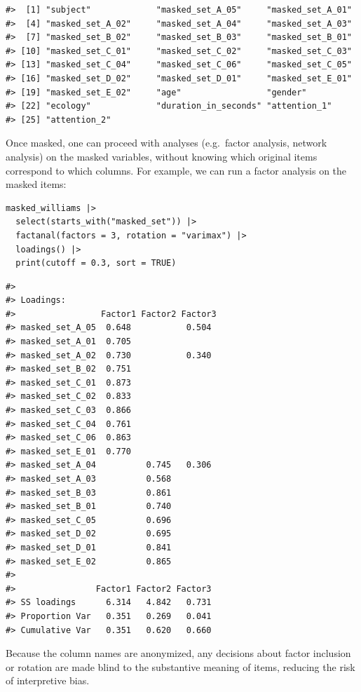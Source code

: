 \begin{verbatim}
#>  [1] "subject"             "masked_set_A_05"     "masked_set_A_01"    
#>  [4] "masked_set_A_02"     "masked_set_A_04"     "masked_set_A_03"    
#>  [7] "masked_set_B_02"     "masked_set_B_03"     "masked_set_B_01"    
#> [10] "masked_set_C_01"     "masked_set_C_02"     "masked_set_C_03"    
#> [13] "masked_set_C_04"     "masked_set_C_06"     "masked_set_C_05"    
#> [16] "masked_set_D_02"     "masked_set_D_01"     "masked_set_E_01"    
#> [19] "masked_set_E_02"     "age"                 "gender"             
#> [22] "ecology"             "duration_in_seconds" "attention_1"        
#> [25] "attention_2"
\end{verbatim}

Once masked, one can proceed with analyses (e.g.~factor analysis, network analysis) on the masked variables, without knowing which original items correspond to which columns. For example, we can run a factor analysis on the masked items:

\begin{verbatim}
masked_williams |> 
  select(starts_with("masked_set")) |> 
  factanal(factors = 3, rotation = "varimax") |> 
  loadings() |> 
  print(cutoff = 0.3, sort = TRUE)
\end{verbatim}

\begin{verbatim}
#> 
#> Loadings:
#>                 Factor1 Factor2 Factor3
#> masked_set_A_05  0.648           0.504 
#> masked_set_A_01  0.705                 
#> masked_set_A_02  0.730           0.340 
#> masked_set_B_02  0.751                 
#> masked_set_C_01  0.873                 
#> masked_set_C_02  0.833                 
#> masked_set_C_03  0.866                 
#> masked_set_C_04  0.761                 
#> masked_set_C_06  0.863                 
#> masked_set_E_01  0.770                 
#> masked_set_A_04          0.745   0.306 
#> masked_set_A_03          0.568         
#> masked_set_B_03          0.861         
#> masked_set_B_01          0.740         
#> masked_set_C_05          0.696         
#> masked_set_D_02          0.695         
#> masked_set_D_01          0.841         
#> masked_set_E_02          0.865         
#> 
#>                Factor1 Factor2 Factor3
#> SS loadings      6.314   4.842   0.731
#> Proportion Var   0.351   0.269   0.041
#> Cumulative Var   0.351   0.620   0.660
\end{verbatim}

Because the column names are anonymized, any decisions about factor inclusion or rotation are made blind to the substantive meaning of items, reducing the risk of interpretive bias.

